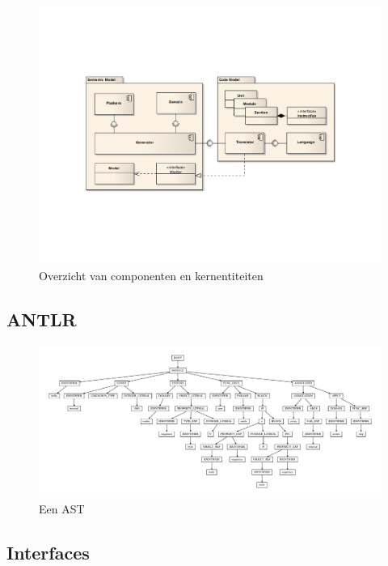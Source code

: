 \begin{figure}[ht]
  \centering
  \includegraphics[width=\linewidth]{resources/component-overview.pdf}
  \caption{Overzicht van componenten en kernentiteiten}
  \label{fig:devel-component-overview}
\end{figure}

\TODO

\subsection{ANTLR}
\label{subsection:devel-antlr}

\TODO

\begin{figure}[ht]
  \centering
  \includegraphics[width=\linewidth]{resources/hello_ast.pdf}
  \caption{Een AST}
  \label{fig:devel-ast}
\end{figure}

\TODO

\subsection{Interfaces}
\label{subsection:devel-codegen-interfaces}

